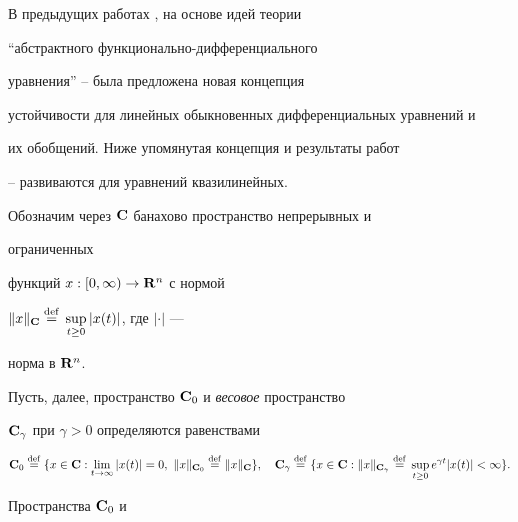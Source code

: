 \date{}




\pagestyle{plain} %







\maketitle


\label{begin}





В предыдущих работах \cite{1}, \cite{2} на основе идей теории


``абстрактного функционально-диф\-фе\-рен\-ци\-аль\-ного


уравнения'' \cite{3}--\cite{5} была предложена новая концепция


устойчивости для линейных обыкновенных дифференциальных уравнений и


их обобщений. Ниже упомянутая концепция и результаты работ


\cite{6}--\cite{9} развиваются для уравнений квазилинейных.





Обозначим через $\bold {C}$ банахово пространство непрерывных и


ограниченных


функций $x:[0,\infty)\to\bold {R}^n$ с нормой


$\|x\|_{\bold C}\overset{\mathrm{def}}{=}{}\sup\limits_{t\ge 0}|x(t)|$, где $|\cdot|$ ---


норма в ${\bold {R}}^n$.


Пусть, далее, пространство ${\bold {C}}_0$ и {\it весовое} пространство


${\bold {C}}_\gamma$ при $\gamma>0$ определяются равенствами


$$


{\spc{C}}_0\eqdef\{x\in{\spc{C}}:\lim_{t\to\infty}|x(t)|=0,


\ \|x\|_{{\bold C}_0}\eqdef \|x\|_{\bold C}\},\quad


{\spc{C}}_\gamma\eqdef\{x\in{\spc{C}}:\|x\|_{{\bold{C}}_\gamma}\eqdef


\sup_{t\ge 0}e^{\gamma t}|x(t)|<\infty\}.


$$


Пространства ${\bold {C}}_0$ и


